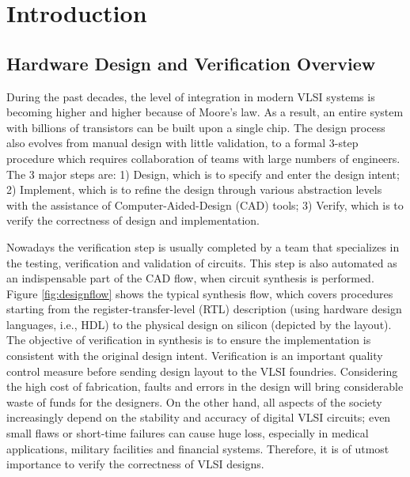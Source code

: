 \chapter{Introduction}
\label{ch:intro}
\vspace{-0.8cm}
\section{Hardware Design and Verification Overview}
During the past decades, the level of integration in modern VLSI systems is becoming higher and higher because of Moore's law.
As a result, an entire system with billions of transistors can be built upon a single chip.
The design process also evolves from manual design with little validation, to 
a formal 3-step procedure which requires collaboration of teams with large numbers of 
engineers. The 3 major steps are: 1) Design, which is to specify and enter the design intent;
2) Implement, which is to refine the design through various abstraction levels with the assistance of Computer-Aided-Design (CAD)
tools; 3) Verify, which is to verify the correctness of design and implementation.

Nowadays the verification step is usually completed by a team that specializes in the testing, verification and validation of 
circuits. This step is also automated as an indispensable part of the CAD flow, when circuit synthesis is performed. 
Figure \ref{fig:designflow} shows the typical synthesis flow, which covers procedures starting from the 
register-transfer-level (RTL) description (using hardware design languages, i.e., HDL) to  the 
physical design on silicon (depicted by the layout). The objective of verification in synthesis is 
to ensure the implementation is consistent with the original design intent. Verification is 
an important quality control measure before sending design layout to the VLSI foundries.
Considering the high cost of fabrication, faults and errors in the design will bring considerable 
waste of funds for the designers. On the other hand, all aspects of the society increasingly depend on 
the stability and accuracy of digital VLSI circuits; even small flaws or short-time failures can cause 
huge loss, especially in medical applications, military facilities and financial systems.
Therefore, it is of utmost importance to verify the correctness of VLSI designs.

